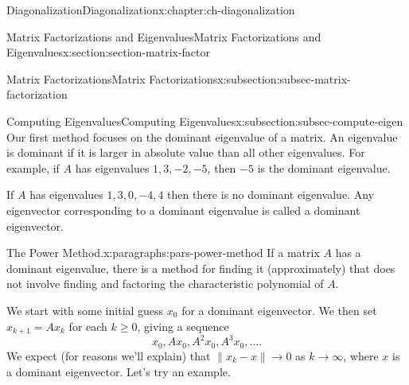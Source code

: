 \documentclass[oneside,10pt,]{book}
\numberwithin{equation}{section}
\newenvironment{codedisplay}
{\VerbatimEnvironment\begin{center}\begin{lrbox}{\codedisplaybox}\begin{BVerbatim}}
{\end{BVerbatim}\end{lrbox}\usebox{\codedisplaybox}\end{center}}
\begin{document}
\begin{chapterptx}{Diagonalization}{}{Diagonalization}{}{}{x:chapter:ch-diagonalization}
\begin{sectionptx}{Matrix Factorizations and Eigenvalues}{}{Matrix Factorizations and Eigenvalues}{}{}{x:section:section-matrix-factor}
\begin{subsectionptx}{Matrix Factorizations}{}{Matrix Factorizations}{}{}{x:subsection:subsec-matrix-factorization}
%
\end{subsectionptx}
%
%
\typeout{************************************************}
\typeout{************************************************}
%
\begin{subsectionptx}{Computing Eigenvalues}{}{Computing Eigenvalues}{}{}{x:subsection:subsec-compute-eigen}
Our first method focuses on the dominant eigenvalue of a matrix. An eigenvalue is dominant if it is larger in absolute value than all other eigenvalues. For example, if \(A\) has eigenvalues \(1,3,-2,-5\), then \(-5\) is the dominant eigenvalue.%
\par
If \(A\) has eigenvalues \(1,3,0,-4,4\) then there is no dominant eigenvalue. Any eigenvector corresponding to a dominant eigenvalue is called a dominant eigenvector.%
\begin{paragraphs}{The Power Method.}{x:paragraphs:pars-power-method}%
If a matrix \(A\) has a dominant eigenvalue, there is a method for finding it (approximately) that does not involve finding and factoring the characteristic polynomial of \(A\).%
\par
We start with some initial guess \(x_0\) for a dominant eigenvector. We then set \(x_{k+1} = Ax_k\) for each \(k\geq 0\), giving a sequence%
\begin{equation*}
x_0, Ax_0, A^2x_0, A^3x_0,\ldots\text{.}
\end{equation*}
We expect (for reasons we'll explain) that \(\lVert x_k-x\rVert \to 0\) as \(k\to\infty\), where \(x\) is a dominant eigenvector. Let's try an example.%

\end{paragraphs}
\end{subsectionptx}
\end{sectionptx}
\end{chapterptx}
\end{document}
